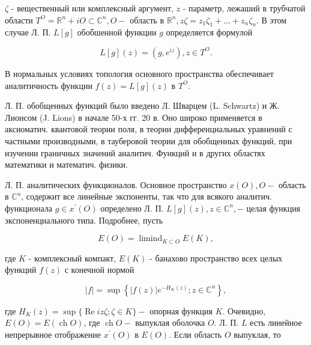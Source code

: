 \documentclass[10pt]{article}
\begin{document}
$\zeta$ - вещественный или комплексный аргумент, $z$ - параметр, лежаший в трубчатой области $T^{O}=\mathbb{R}^{n}+i O \subset \mathbb{C}^{n}, O-$ область в $\mathbb{R}^{n}, z \zeta=z_{1} \zeta_{1}+\ldots+z_{n} \zeta_{n}$. В этом случае Л. П. $L[g]$ обобшенной функции $g$ определяется формулой



\[

L[g](z)=\left(g, e^{i z}\right), z \in T^{O} .

\]



В нормальных условиях топология основного пространства обеспечивает аналитичность функции $f(z)=L[g](z)$ в $T^{O}$.



Л. П. обобщенных функций было введено Л. Шварцем (L. Schwartz) и Ж. Лионсом (J. Lions) в начале 50-х гг. 20 в. Оно широко применяется в аксиоматич. квантовой теории поля, в теории дифференциальных уравнений с частными производными, в тауберовой теории для обобщенных функций, при изучении граничных значений аналитич. Функций и в других областях математики и математич. физики.



Л. П. аналитических функционалов. Основное пространство $x(O), O-$ область в $\mathbb{C}^{n}$, содержит все линейные экспоненты, так что для всякого аналитич. функционала $g \in x^{\prime}(O)$ определено Л. П. $L[g](z), z \in \mathbb{C}^{n},-$ целая функция экспоненциального типа. Подробнее, пусть



\[

E(O)=\operatorname{limind}_{K \subset O} E(K),

\]



где $K$ - комплексный компакт, $E(K)$ - банахово пространство всех целых функций $f(z)$ с конечной нормой



\[

|f|=\sup \left\{|f(z)| e^{-H_{K}(z)} ; z \in \mathbb{C}^{n}\right\},

\]



где $H_{K}(z)=\sup \{\operatorname{Re} i z \zeta ; \zeta \in K\}-$ опорная функция $K$. Очевидно, $E(O)=E(\operatorname{ch} O)$, где $\operatorname{ch} O-$ выпуклая оболочка $O$. Л. П. $L$ есть линейное непрерывное отображение $x^{\prime}(O)$ в $E(O)$. Если область $O$ выпуклая, то
\end{document}
